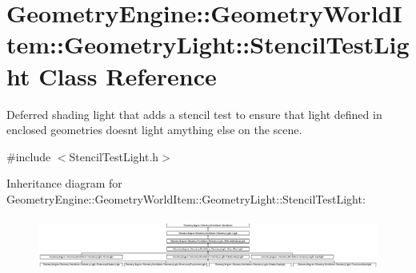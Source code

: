 \hypertarget{class_geometry_engine_1_1_geometry_world_item_1_1_geometry_light_1_1_stencil_test_light}{}\section{Geometry\+Engine\+::Geometry\+World\+Item\+::Geometry\+Light\+::Stencil\+Test\+Light Class Reference}
\label{class_geometry_engine_1_1_geometry_world_item_1_1_geometry_light_1_1_stencil_test_light}


Deferred shading light that adds a stencil test to ensure that light defined in enclosed geometries doesn\textquotesingle{}t light amything else on the scene.  




{\ttfamily \#include $<$Stencil\+Test\+Light.\+h$>$}

Inheritance diagram for Geometry\+Engine\+::Geometry\+World\+Item\+::Geometry\+Light\+::Stencil\+Test\+Light\+:\begin{figure}[H]
\begin{center}
\leavevmode
\includegraphics[height=1.768421cm]{class_geometry_engine_1_1_geometry_world_item_1_1_geometry_light_1_1_stencil_test_light}
\end{center}
\end{figure}
